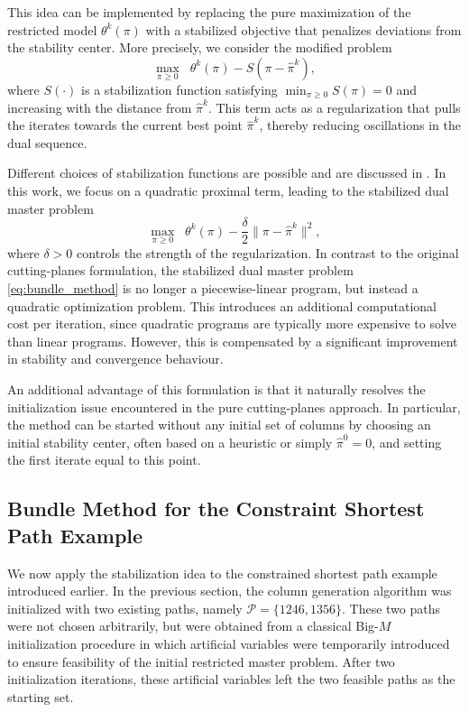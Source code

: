 \documentclass{book}
\theoremstyle{definition}
\newcounter{algorithm_}
\numberwithin{algorithm_}{chapter}
\begin{document}
\bigskip

This idea can be implemented by replacing the pure maximization of the restricted model $\theta^k(\pi)$ with a stabilized objective that penalizes deviations from the stability center. More precisely, we consider the modified problem
\[
\max_{\pi \ge 0} \;\; \theta^k(\pi) - S(\pi - \hat{\pi}^k),
\]
where $S(\cdot)$ is a stabilization function satisfying $\min_{\pi \ge 0} S(\pi) = 0$ and increasing with the distance from $\hat{\pi}^k$. This term acts as a regularization that pulls the iterates towards the current best point $\hat{\pi}^k$, thereby reducing oscillations in the dual sequence.

\bigskip

Different choices of stabilization functions are possible and are discussed in \cite{briant2008}. In this work, we focus on a quadratic proximal term, leading to the stabilized dual master problem
\begin{equation} \label{eq:bundle_method}
\max_{\pi \ge 0} \;\; \theta^k(\pi) - \frac{\delta}{2}\|\pi - \hat{\pi}^k\|^2,
\end{equation}
where $\delta > 0$ controls the strength of the regularization. In contrast to the original cutting-planes formulation, the stabilized dual master problem \eqref{eq:bundle_method} is no longer a piecewise-linear program, but instead a quadratic optimization problem. This introduces an additional computational cost per iteration, since quadratic programs are typically more expensive to solve than linear programs. However, this is compensated by a significant improvement in stability and convergence behaviour.

\bigskip

An additional advantage of this formulation is that it naturally resolves the initialization issue encountered in the pure cutting-planes approach. In particular, the method can be started without any initial set of columns by choosing an initial stability center, often based on a heuristic or simply $\hat{\pi}^0 = 0$, and setting the first iterate equal to this point.


\subsection{Bundle Method for the Constraint Shortest Path Example}

We now apply the stabilization idea to the constrained shortest path example introduced earlier. In the previous section, the column generation algorithm was initialized with two existing paths, namely $\mathcal{P} = \{1246, 1356\}$. These two paths were not chosen arbitrarily, but were obtained from a classical Big-$M$ initialization procedure in which artificial variables were temporarily introduced to ensure feasibility of the initial restricted master problem. After two initialization iterations, these artificial variables left the two feasible paths as the starting set.
\end{document}
